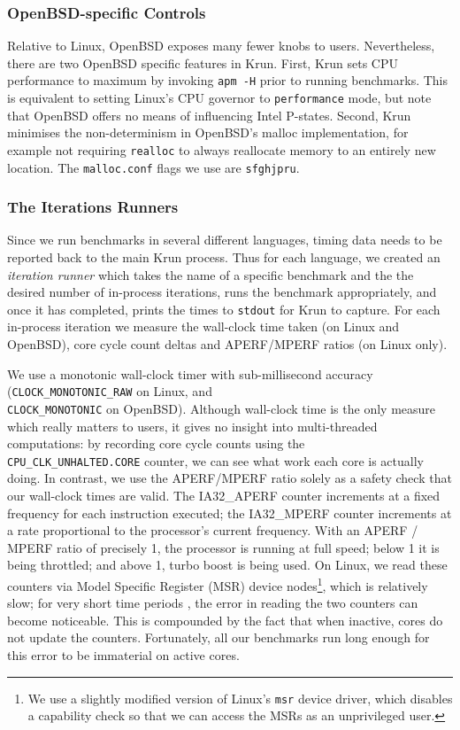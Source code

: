 \documentclass[preprint,numbers,10pt]{sigplanconf}
\newcommand{\krun}{Krun\xspace}
\begin{document}
\subsubsection{OpenBSD-specific Controls}

Relative to Linux, OpenBSD exposes many fewer knobs to users. Nevertheless,
there are two OpenBSD specific features in \krun.
First, \krun sets CPU performance to maximum by invoking \texttt{apm -H} prior
to running benchmarks. This is equivalent to setting Linux's CPU governor to
\texttt{performance} mode, but note that OpenBSD offers no means of influencing
Intel P-states.
Second, \krun minimises the non-determinism in OpenBSD's malloc implementation,
for example not requiring \texttt{realloc} to always reallocate memory to
an entirely new location. The \texttt{malloc.conf} flags we use are \texttt{sfghjpru}.


\subsubsection{The Iterations Runners}

Since we run benchmarks in several different languages, timing data needs
to be reported back to the main \krun process. Thus for each language, we created an
\emph{iteration runner} which takes the name of a specific benchmark and the
the desired number of in-process iterations, runs the benchmark appropriately,
and once it has completed, prints the times to \texttt{stdout} for \krun to
capture. For each in-process iteration we
measure the wall-clock time taken (on Linux and OpenBSD), core
cycle count deltas and APERF/MPERF ratios (on Linux only).

We use a monotonic wall-clock timer with sub-millisecond accuracy
(\texttt{CLOCK\_MONOTONIC\_RAW} on Linux, and \\\texttt{CLOCK\_MONOTONIC} on
OpenBSD). Although wall-clock time is the only measure which really matters to
users, it gives no insight into multi-threaded computations: by recording
core cycle counts using the \\\texttt{CPU\_CLK\_UNHALTED.CORE} counter, we can see
what work each core is actually doing. In contrast, we use the APERF/MPERF
ratio solely as a safety check that our wall-clock times are valid.
The IA32\_APERF counter increments at a fixed
frequency for each instruction executed; the IA32\_MPERF counter increments at a rate
proportional to the processor's current frequency. With an APERF / MPERF ratio of
precisely 1, the processor is running at full speed; below 1 it is being
throttled; and above 1, turbo boost is being used. On
Linux, we read these counters via Model Specific Register (MSR) device
nodes\footnote{We use a slightly modified version of Linux's \texttt{msr} device
driver, which disables a capability check so that we can access the MSRs as an
unprivileged user.}, which is relatively
slow; for very short time periods , the error in reading the two counters can become
noticeable. This is compounded by the fact that when inactive, cores do not
update the counters. Fortunately, all our benchmarks run long enough for this
error to be immaterial on active cores. \label{error in cycle counts}
\end{document}
